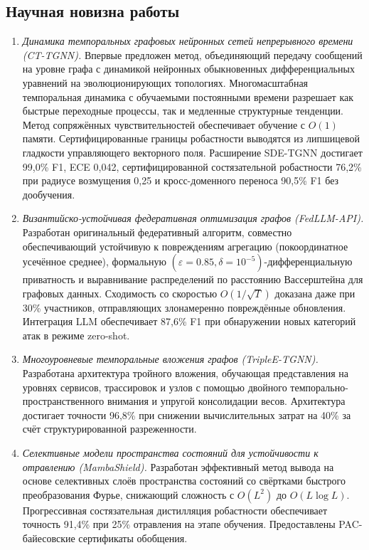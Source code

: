 \documentclass[12pt,a5paper]{article}
\begin{document}
\subsection*{Научная новизна работы}

\begin{enumerate}
\item \textit{Динамика темпоральных графовых нейронных сетей непрерывного времени (CT-TGNN).} Впервые предложен метод, объединяющий передачу сообщений на уровне графа с динамикой нейронных обыкновенных дифференциальных уравнений на эволюционирующих топологиях. Многомасштабная темпоральная динамика с обучаемыми постоянными времени разрешает как быстрые переходные процессы, так и медленные структурные тенденции. Метод сопряжённых чувствительностей обеспечивает обучение с $O(1)$ памяти. Сертифицированные границы робастности выводятся из липшицевой гладкости управляющего векторного поля. Расширение SDE-TGNN достигает 99,0\% F1, ECE 0,042, сертифицированной состязательной робастности 76,2\% при радиусе возмущения 0,25 и кросс-доменного переноса 90,5\% F1 без дообучения.

\item \textit{Византийско-устойчивая федеративная оптимизация графов (FedLLM-API).} Разработан оригинальный федеративный алгоритм, совместно обеспечивающий устойчивую к повреждениям агрегацию (покоординатное усечённое среднее), формальную $(\varepsilon{=}0.85, \delta{=}10^{-5})$-дифференциальную приватность и выравнивание распределений по расстоянию Вассерштейна для графовых данных. Сходимость со скоростью $O(1/\sqrt{T})$ доказана даже при 30\% участников, отправляющих злонамеренно повреждённые обновления. Интеграция LLM обеспечивает 87,6\% F1 при обнаружении новых категорий атак в режиме zero-shot.

\item \textit{Многоуровневые темпоральные вложения графов (TripleE-TGNN).} Разработана архитектура тройного вложения, обучающая представления на уровнях сервисов, трассировок и узлов с помощью двойного темпорально-пространственного внимания и упругой консолидации весов. Архитектура достигает точности 96,8\% при снижении вычислительных затрат на 40\% за счёт структурированной разреженности.

\item \textit{Селективные модели пространства состояний для устойчивости к отравлению (MambaShield).} Разработан эффективный метод вывода на основе селективных слоёв пространства состояний со свёртками быстрого преобразования Фурье, снижающий сложность с $O(L^2)$ до $O(L \log L)$. Прогрессивная состязательная дистилляция робастности обеспечивает точность 91,4\% при 25\% отравления на этапе обучения. Предоставлены PAC-байесовские сертификаты обобщения.


\end{enumerate}
\end{document}
